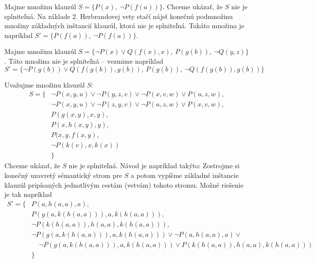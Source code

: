 \begin{priklad}
    Majme množinu klauzúl $S=\{P(x),\ \neg P(f(a))\}$.
    Chceme ukázať, že $S$ nie je splniteľná.
    Na základe 2. Herbrandovej vety stačí nájsť konečnú podmnožinu
    množiny základných inštancií klauzúl, ktorá nie je splniteľná.
    Takáto množina je napríklad $S' = \{ P(f(a)),\ \neg P(f(a))\}$.
\end{priklad}

\begin{priklad}
    Majme množinu klauzúl $S=\{\neg P(x) \lor Q(f(x),x),\
        P(g(b)),\ \neg Q(y,z) \}$.
    Táto množina nie je splniteľná -- vezmime napríklad
    \begin{equation*}
        S' = \{ \neg P(g(b)) \lor Q(f(g(b)), g(b)),\ P(g(b)),\ 
                \neg Q(f(g(b)), g(b)) \}
    \end{equation*}
\end{priklad}

\begin{priklad}
    Uvažujme množinu klauzúl $S$:
    \begin{equation*}
    \begin{split}
        S = \big\{& \neg P(x,y,u) \lor \neg P(y,z,v) \lor 
                    \neg P(x,v,w) \lor P(u,z,w), \\
	         & \neg P(x,y,u) \lor \neg P(z,y,v) \lor
                    \neg P(u,z,w) \lor P(x,v,w), \\
	         & P(g(x,y),x,y), \\
                 & P(x,h(x,y),y), \\
                 & P(x,y,f(x,y), \\
                 & \neg P(k(v),x,k(x)) \\
                 & \big\}
    \end{split}
    \end{equation*}
    Chceme ukázať, že $S$ nie je splniteľná. Návod je napríklad
    takýto: Zostrojme si konečný uzavretý sémantický strom pre $S$
    a potom vypíšme základné inštancie klauzúl pripísaných jednotlivým
    cestám (vetvám) tohoto stromu.
    Možné riešenie je tak napríklad
    \begin{equation*}
    \begin{split}
        S' = \big\{& P(a,h(a,a),a), \\
                   & P(g(a,k(h(a,a))),a,k(h(a,a))),\\
                   & \neg P(k(h(a,a)),h(a,a),k(h(a,a))),\\
                   & \neg P(g(a,k(h(a,a))),a,k(h(a,a))) \lor
                    \neg P(a,h(a,a),a) \lor \\ & \phantom{\lor}
                    \neg P(g(a,k(h(a,a))),a,k(h(a,a))) \lor
                    P(k(h(a,a)),h(a,a),k(h(a,a))) \\
                &\big\}
    \end{split}
    \end{equation*}
\end{priklad}


